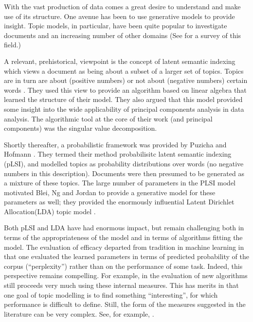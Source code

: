 
With the vast production of data comes a great desire
to understand and make use of its structure. One
avenue has been to use generative models to provide
insight.  Topic models, in particular,
have been quite popular to investigate documents
and an increasing number of other domains (See \cite{BleiCACM} for
a survey of this field.)


A relevant, prehistorical, viewpoint is the concept of latent semantic
indexing which views a document as being about a subset of a larger
set of topics.  Topics are in turn are about (positive numbers) or not
about (negative numbers) certain words \cite{Papadimitriou1997}.  They
used this view to provide an algorithm based on linear algebra that
learned the structure of their model.  They also argued that this
model provided some insight into the wide applicability of principal
components analysis in data analysis. The algorithmic tool at the
core of their work (and principal components) was the singular value
decomposition.

Shortly thereafter, a probabilistic framework was provided by Puzicha
and Hofmann \cite{Hofmann04}.  They termed their method probabilisitc latent
semantic indexing (pLSI), and modelled topics as probability
distributions over words (no negative numbers in this description).
Documents were then presumed to be generated as a mixture of these
topics.  The large number of parameters in the PLSI model motivated
Blei, Ng and Jordan to provide a generative model for these parameters
as well; they provided the enormously influential Latent Dirichlet
Allocation(LDA) topic model \cite{Blei2003a}.

Both pLSI and LDA have had enormous impact, but remain challenging
both in terms of the appropriateness of the model and in terms of
algorithms fitting the model.  The evaluation of efficacy departed
from tradition in machine learning in that one evaluated the learned
parameters in terms of predicted probability of the corpus
(``perplexity'') rather than on the performance of some task. Indeed,
this perspective remains compelling.  For example, in
\cite{BleiCBA} the evaluation of new algorithms still proceeds very
much using these internal measures.  This has merits in that one goal
of topic modelling is to find something ``interesting'', for which
performance is difficult to define.  Still, the form of the measures
suggested in the literature can be very complex.  See, for example, \cite{BleiCBA}.
 

